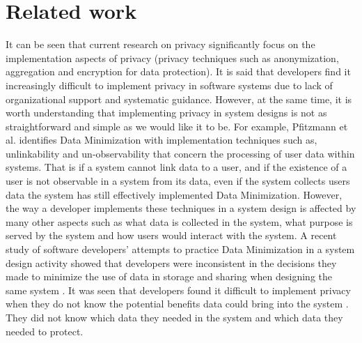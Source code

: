\documentclass{sigchi}
\begin{document}
\section {Related work}

It can be seen that current research on privacy significantly focus on the implementation aspects of privacy (privacy techniques such as anonymization, aggregation and encryption for data protection). It is said that developers find it increasingly difficult to implement privacy in software systems due to lack of organizational support and systematic guidance. However, at the same time, it is worth understanding that implementing privacy in system designs is not as straightforward and simple as we would like it to be. For example, Pfitzmann et al. \cite {pfitzmann2010terminology} identifies Data Minimization with implementation techniques such as, unlinkability and un-observability that concern the processing of user data within systems. That is if a system cannot link data to a user, and if the existence of a user is not observable in a system from its data, even if the system collects users data the system has still effectively implemented Data Minimization. However, the way a developer implements these techniques in a system design is affected by many other aspects such as what data is collected in the system, what purpose is served by the system and how users would interact with the system. A recent study of software developers' attempts to practice Data Minimization in a system design activity showed that developers were inconsistent in the decisions they made to minimize the use of data in storage and sharing when designing the same system \cite {schiffner2018towards, senarath2018under}. It was seen that developers found  it difficult to implement privacy when they do not know the potential benefits data could bring into the system \cite {senarath2018under}. They did not know which data they needed in the system and which data they needed to protect.
\end{document}
